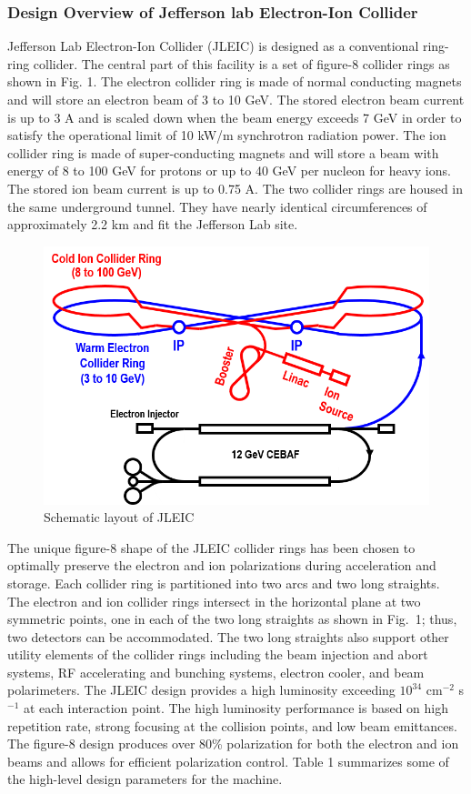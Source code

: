 \subsubsection{Design Overview of Jefferson lab Electron-Ion Collider}
Jefferson Lab Electron-Ion Collider (JLEIC) is designed as a conventional ring-ring collider.
\cite{Abeyratne:2015pma} The central part of this facility is a set of figure-8 collider rings as shown in Fig. 1. The electron collider ring is made of normal conducting magnets and will store an electron beam of 3 to 10 GeV. The stored electron beam current is up to 3 A and is scaled down when the beam energy exceeds 7 GeV in order to satisfy the operational limit of 10 kW/m synchrotron radiation power. The ion collider ring is made of super-conducting magnets and will store a beam with energy of 8 to 100 GeV for protons or up to 40 GeV per nucleon for heavy ions. The stored ion beam current is up to 0.75 A. The two collider rings are housed in the same underground tunnel. They have nearly identical circumferences of approximately 2.2 km and fit the Jefferson Lab site.

\begin{figure}[!htb]
	\centering
	\includegraphics[width=.75\textwidth]{../../img/jleic_schematic.png}
	\caption{Schematic layout of JLEIC}
	\label{fig:jleic1}
\end{figure}

The unique figure-8 shape of the JLEIC collider rings has been chosen to optimally preserve the electron and ion polarizations during acceleration and storage. \cite{Kondratenko:2016eqn}  
Each collider ring is partitioned into two arcs and two long straights. The electron and ion collider rings intersect in the horizontal plane at two symmetric points, one in each of the two long straights as shown in Fig. 1; thus, two detectors can be accommodated. The two long straights also support other utility elements of the collider rings including the beam injection and abort systems, RF accelerating and bunching systems, electron cooler, and beam polarimeters.
The JLEIC design provides a high luminosity exceeding $10^{34}$ cm$^{-2}$ s$^{-1}$ at each interaction point. The high luminosity performance is based on high repetition rate, strong focusing at the collision points, and low beam emittances. The figure-8 design produces over 80\% polarization for both the electron and ion beams and allows for efficient polarization control. Table 1 summarizes some of the high-level design parameters for the machine.

